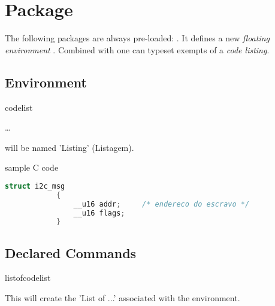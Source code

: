 \documentclass[article,nogeometry,english,tocdepth=3,secdepth=3]{ufrgscca} %
\newif\iffulldoc
\begin{document}
\section{ Package}
The following packages are always pre-loaded: .
It defines a new \emph{floating environment} . Combined with  one can typeset exempts of a \emph{code listing}.

\subsection{Environment}
\begin{codedescribe}[env]{codelist}
	\begin{codesyntax}%
		\tsmacro{\begin{codelist}}{}\ldots \tsmacro{\end{codelist}}{}
	\end{codesyntax}
\tsmacro{\caption}{} will be named 'Listing' (Listagem).

\begin{codestore}[st=d.listing]
	\begin{codelist}[htbp]
		\caption{sample C code}
		\label{code01}
		\begin{lstlisting}[language=C]
			struct i2c_msg
			{
				__u16 addr;     /* endereco do escravo */
				__u16 flags;
			}
		\end{lstlisting}
		{\sourcecitation{\textcite{Garg:SMA-2000}}}
	\end{codelist}
\end{codestore}

\end{codedescribe}

\subsection{Declared Commands}
\begin{codedescribe}{listofcodelist}
	\begin{codesyntax}%
		\tsmacro{\listofcodelist}{}
	\end{codesyntax}
This will create the 'List of ...' associated with the  environment.
\end{codedescribe}

\iffulldoc
\end{document}
